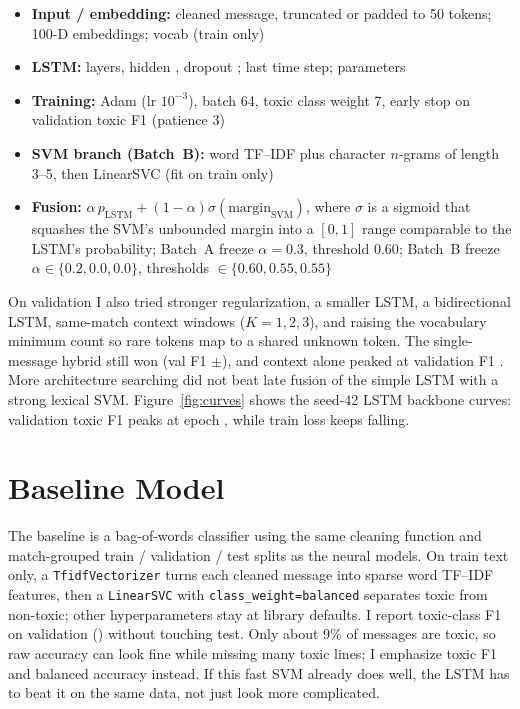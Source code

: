 \begin{itemize}
  \setlength{\itemsep}{0.1em}
  \setlength{\parsep}{0pt}
  \item \textbf{Input / embedding:} cleaned message, truncated or padded to 50 tokens; 100-D embeddings; vocab \HybridVocabSize{} (train only)
  \item \textbf{LSTM:} \HybridLayers{} layers, hidden \HybridHiddenDimension{}, dropout \HybridDropout; last time step; \HybridParameters{} parameters
  \item \textbf{Training:} Adam (lr $10^{-3}$), batch 64, toxic class weight 7, early stop on validation toxic F1 (patience 3)
  \item \textbf{SVM branch (Batch~B):} word TF--IDF plus character $n$-grams of length 3--5, then LinearSVC (fit on train only)
  \item \textbf{Fusion:} $\alpha\,p_{\mathrm{LSTM}}+(1-\alpha)\sigma(\mathrm{margin}_{\mathrm{SVM}})$, where $\sigma$ is a sigmoid that squashes the SVM's unbounded margin into a $[0,1]$ range comparable to the LSTM's probability; Batch~A freeze $\alpha=0.3$, threshold $0.60$; Batch~B freeze $\alpha\in\{0.2,0.0,0.0\}$, thresholds $\in\{0.60,0.55,0.55\}$
\end{itemize}

On validation I also tried stronger regularization, a smaller LSTM, a bidirectional LSTM, same-match context windows ($K=1,2,3$), and raising the vocabulary minimum count so rare tokens map to a shared unknown token. The single-message hybrid still won (val F1 \HybridValidationFOne$\pm$\HybridValidationFOneStd), and context alone peaked at validation F1 \ContextBestValidationFOne. More architecture searching did not beat late fusion of the simple LSTM with a strong lexical SVM. Figure~\ref{fig:curves} shows the seed-42 LSTM backbone curves: validation toxic F1 peaks at epoch \HybridBestEpoch{}, while train loss keeps falling.

\section*{Baseline Model}

The baseline is a bag-of-words classifier using the same cleaning function and match-grouped train / validation / test splits as the neural models. On train text only, a \texttt{TfidfVectorizer} turns each cleaned message into sparse word TF--IDF features, then a \texttt{LinearSVC} with \texttt{class\_weight=balanced} separates toxic from non-toxic; other hyperparameters stay at library defaults. I report toxic-class F1 on validation (\BaselineValidationFOne) without touching test. Only about 9\% of messages are toxic, so raw accuracy can look fine while missing many toxic lines; I emphasize toxic F1 and balanced accuracy instead. If this fast SVM already does well, the LSTM has to beat it on the same data, not just look more complicated.

